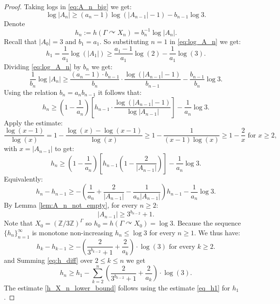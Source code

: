 \documentclass[oneside,english]{amsart}
\theoremstyle{definition}
\newcommand{\ZZ}{\mathbb{Z}}
\newcommand{\act}[2]{{#1} \curvearrowright {#2}}
\begin{document}
\begin{proof}
Taking logs in  \eqref{eq:A_n_big} we get:
\begin{equation}\label{eq:log_A_n}
\log |A_n| \ge (a_{n} -1) \log\left( |A_{n-1}|- 1\right) - b_{n-1} \log 3 .
\end{equation}
Denote
\begin{equation}
h_n := h(\act{\Gamma}{X_n})= b_n^{-1} \log |A_n| .
\end{equation}
Recall that $|A_0|=3$ and $b_1=a_1$. So substituting  $n=1$ in \eqref{eq:log_A_n} we get:
\begin{equation}\label{eq_h1}
h_1 = \frac{1}{a_1}\log(|A_1|) \ge \frac{a_1-1}{a_1}\log(2)- \frac{1}{a_1}\log(3).
\end{equation}
Dividing \eqref{eq:log_A_n} by $b_n$ we get:
$$\frac{1}{b_n}\log |A_n| \ge \frac{(a_n -1)\cdot b_{n-1}}{b_n} \cdot \frac{\log \left(|A_{n-1}|-1 \right)}{b_{n-1}}  -\frac{ b_{n-1}}{b_n} \log 3.$$
Using the relation $b_n = a_n b_{n-1}$ it follows that:
$$h_n \ge \left(1-  \frac{1}{a_n}\right)\left[h_{n-1}\cdot\frac{\log(|A_{n-1}|-1)}{\log |A_{n-1}|}\right] - \frac{1}{a_n}\log 3 .$$
Apply  the estimate:
$$\frac{\log(x-1)}{\log(x)} = 1 -\frac{\log(x)-\log(x-1)}{\log(x)} \ge 1- \frac{1}{(x-1)\log(x)} \ge 1- \frac{2}{x} \mbox{ for } x\ge 2,$$
with $x= |A_{n-1}|$ to get:
$$h_n\ge \left(1-  \frac{1}{a_n}\right)\left[h_{n-1}\left(1-\frac{2}{|A_{n-1}|}\right)\right] - \frac{1}{a_n}\log 3 .$$
Equivalently:
$$h_n - h_{n-1} \ge -\left(\frac{1}{a_n}+\frac{2}{|A_{n-1}|} -\frac{1}{a_n|A_{n-1}|}\right)h_{n-1}- \frac{1}{a_n}\log 3.$$
By  Lemma \ref{lem:A_n_not_empty}, for  every $n \ge 2$:
$$|A_{n-1}| \ge 3^{b_{n-2}}+1.$$
Note that $X_0= (\ZZ/3\ZZ)^\Gamma$ so $h_0= h(\act{\Gamma}{X_0}) = \log 3$. Because the sequence $\{h_n\}_{n=1}^\infty$ is monotone non-increasing $h_n \le \log 3$ for every $n \ge 1$.
We thus have:
\begin{equation}\label{eq:h_diff}
h_k - h_{k-1} \ge  -\left(\frac{2}{3^{b_{k-2}}+1}+\frac{2}{a_k}\right)\cdot \log(3) \mbox{ for every } k \ge 2.
\end{equation}
and
Summing \eqref{eq:h_diff} over $2 \le k \le n$ we get
$$ h_n \ge h_1 - \sum_{k=2}^n \left(\frac{2}{3^{b_{k-2}}+1}+\frac{2}{a_k}\right)\cdot \log(3).$$
The estimate \eqref{h_X_n_lower_bound} follows using  the estimate \eqref{eq_h1} for $h_1$.
\end{proof}
\end{document}
